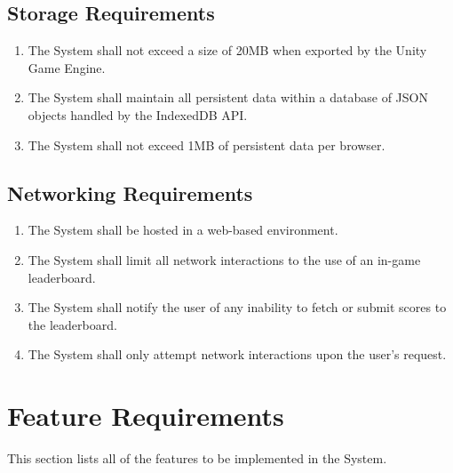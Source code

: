 \documentclass[12pt]{report}
\newenvironment{reqlist}{
	\renewcommand{\labelenumi}{\tab\thesubsection.\arabic{enumi}}
	\renewcommand{\labelenumii}{\thesubsection.\arabic{enumi}.\arabic{enumii}}
	\begin{enumerate}[itemsep = 1pt, parsep = 0pt, leftmargin = *]
}{\end{enumerate}}
\begin{document}
	\subsection{Storage Requirements}
		\begin{reqlist}
			\item The System shall not exceed a size of 20MB when exported by the Unity Game Engine.
			\item The System shall maintain all persistent data within a database of JSON objects handled by the IndexedDB API.
			\item The System shall not exceed 1MB of persistent data per browser.
		\end{reqlist}
	\subsection{Networking Requirements}
		\begin{reqlist}
			\item The System shall be hosted in a web-based environment.
			\item The System shall limit all network interactions to the use of an in-game leaderboard.
			\item The System shall notify the user of any inability to fetch or submit scores to the leaderboard.
			\item The System shall only attempt network interactions upon the user's request.
		\end{reqlist}
		
\section{Feature Requirements}
	This section lists all of the features to be implemented in the System.
\end{document}
